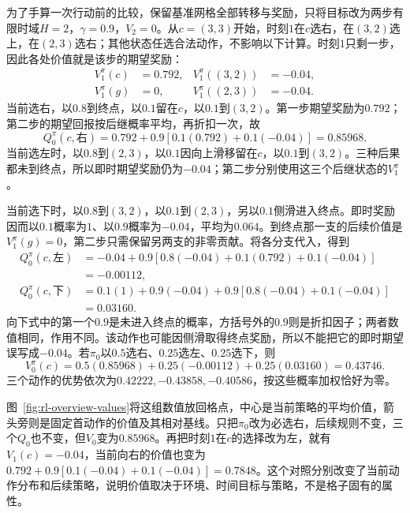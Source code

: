 \begin{example}[随机网格中的两步价值]
  \label{ex:rl-overview-values}
  为了手算一次行动前的比较，保留基准网格全部转移与奖励，只将目标改为两步有限时域$H=2$，$\gamma=0.9$，$V_2=0$。从$c=(3,3)$开始，时刻$1$在$c$选右，在$(3,2)$选上，在$(2,3)$选右；其他状态任选合法动作，不影响以下计算。时刻$1$只剩一步，因此各处价值就是该步的期望奖励：
  \[
  \begin{aligned}
    V_1^\pi(c)&=0.792,& V_1^\pi((3,2))&=-0.04,\\
    V_1^\pi(g)&=0,& V_1^\pi((2,3))&=-0.04.
  \end{aligned}
  \]
  当前选右，以$0.8$到终点，以$0.1$留在$c$，以$0.1$到$(3,2)$。第一步期望奖励为$0.792$；第二步的期望回报按后继概率平均，再折扣一次，故
  \[
    Q_0^\pi(c,\text{右})
     =0.792+0.9[0.1(0.792)+0.1(-0.04)]=0.85968.
  \]
  当前选左时，以$0.8$到$(2,3)$，以$0.1$因向上滑移留在$c$，以$0.1$到$(3,2)$。三种后果都未到终点，所以即时期望奖励仍为$-0.04$；第二步分别使用这三个后继状态的$V_1^\pi$。

  当前选下时，以$0.8$到$(3,2)$，以$0.1$到$(2,3)$，另以$0.1$侧滑进入终点。即时奖励因而以$0.1$概率为$1$、以$0.9$概率为$-0.04$，平均为$0.064$。到终点那一支的后续价值是$V_1^\pi(g)=0$，第二步只需保留另两支的非零贡献。将各分支代入，得到
  \[
  \begin{aligned}
    Q_0^\pi(c,\text{左})
      &=-0.04+0.9[0.8(-0.04)+0.1(0.792)+0.1(-0.04)]\\
      &=-0.00112,\\
    Q_0^\pi(c,\text{下})
      &=0.1(1)+0.9(-0.04)+0.9[0.8(-0.04)+0.1(-0.04)]\\
      &=0.03160.
  \end{aligned}
  \]
  向下式中的第一个$0.9$是未进入终点的概率，方括号外的$0.9$则是折扣因子；两者数值相同，作用不同。该动作也可能因侧滑取得终点奖励，所以不能把它的即时期望误写成$-0.04$。若$\pi_0$以$0.5$选右、$0.25$选左、$0.25$选下，则
  \[
    V_0^\pi(c)=0.5(0.85968)+0.25(-0.00112)+0.25(0.03160)
              =0.43746.
  \]
  三个动作的优势依次为$0.42222,-0.43858,-0.40586$，按这些概率加权恰好为零。
\end{example}

图~\ref{fig:rl-overview-values}将这组数值放回格点，中心是当前策略的平均价值，箭头旁则是固定首动作的价值及其相对基线。只把$\pi_0$改为必选右，后续规则不变，三个$Q_0$也不变，但$V_0$变为$0.85968$。再把时刻$1$在$c$的选择改为左，就有$V_1(c)=-0.04$，当前向右的价值也变为$0.792+0.9[0.1(-0.04)+0.1(-0.04)]=0.7848$。这个对照分别改变了当前动作分布和后续策略，说明价值取决于环境、时间目标与策略，不是格子固有的属性。

